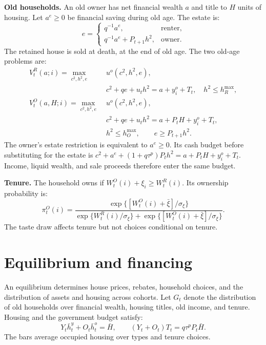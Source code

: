 \documentclass[11pt]{article}
\begin{document}
\textbf{Old households.} An old owner has net financial wealth $a$ and title
to $H$ units of housing. Let $a^e\ge0$ be financial saving during old age.
The estate is:
\begin{equation}
e=\begin{cases}
q^{-1}a^e,&\text{renter},\\
q^{-1}a^e+P_{t+1}h^2,&\text{owner}.
\end{cases}
\label{eq:new_estate}
\end{equation}
The retained house is sold at death, at the end of old age. The two old-age
problems are:
\begin{align}
V_t^R(a;i)=\max_{c^2,h^2,e}\;&u^o(c^2,h^2,e),\nonumber\\
&c^2+qe+u_th^2=a+y_i^o+T_t,\quad h^2\le h_R^{\max},
\label{eq:new_old_renter}\\
V_t^O(a,H;i)=\max_{c^2,h^2,e}\;&u^o(c^2,h^2,e),\nonumber\\
&c^2+qe+u_th^2=a+P_tH+y_i^o+T_t,\nonumber\\
&h^2\le h_O^{\max},\qquad e\ge P_{t+1}h^2.
\label{eq:new_old_owner}
\end{align}
The owner's estate restriction is equivalent to $a^e\ge0$. Its cash budget
before substituting for the estate is
$c^2+a^e+(1+q\tau^p)P_th^2=a+P_tH+y_i^o+T_t$.
Income, liquid wealth, and sale proceeds therefore enter the same budget.

\textbf{Tenure.} The household owns if $W_t^O(i)+\xi_i\ge W_t^R(i)$.
Its ownership probability is:
\begin{equation}
\pi_t^O(i)=
\frac{\exp\{[W_t^O(i)+\bar\xi]/\sigma_\xi\}}
{\exp\{W_t^R(i)/\sigma_\xi\}+\exp\{[W_t^O(i)+\bar\xi]/\sigma_\xi\}}.
\label{eq:new_tenure}
\end{equation}
The taste draw affects tenure but not choices conditional on tenure.

\section{Equilibrium and financing}

An equilibrium determines house prices, rebates, household choices, and the
distribution of assets and housing across cohorts. Let $G_t$ denote the
distribution of old households over financial wealth, housing titles, old
income, and tenure. Housing and the government budget satisfy:
\begin{equation}
Y_t\bar h_t^y+O_t\bar h_t^o=\bar H,\qquad
(Y_t+O_t)T_t=q\tau^pP_t\bar H.
\label{eq:new_markets}
\end{equation}
The bars average occupied housing over types and tenure choices.
\end{document}
